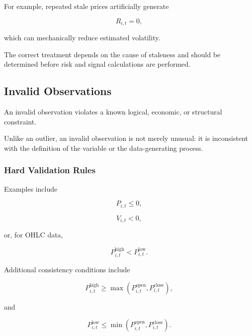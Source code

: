 \documentclass[11pt,a4paper]{article}
\begin{document}
For example, repeated stale prices artificially generate

\begin{equation}
R_{i,t}=0,
\end{equation}

which can mechanically reduce estimated volatility.

The correct treatment depends on the cause of staleness and should be
determined before risk and signal calculations are performed.


\subsection{Invalid Observations}
\label{subsec:invalid_observations}

An invalid observation violates a known logical, economic, or structural
constraint.

Unlike an outlier, an invalid observation is not merely unusual: it is
inconsistent with the definition of the variable or the data-generating
process.


\subsubsection{Hard Validation Rules}

Examples include

\begin{equation}
P_{i,t}\leq0,
\end{equation}

\begin{equation}
V_{i,t}<0,
\end{equation}

or, for OHLC data,

\begin{equation}
P_{i,t}^{\mathrm{high}}
<
P_{i,t}^{\mathrm{low}}.
\end{equation}

Additional consistency conditions include

\begin{equation}
P_{i,t}^{\mathrm{high}}
\geq
\max
\left(
P_{i,t}^{\mathrm{open}},
P_{i,t}^{\mathrm{close}}
\right),
\end{equation}

and

\begin{equation}
P_{i,t}^{\mathrm{low}}
\leq
\min
\left(
P_{i,t}^{\mathrm{open}},
P_{i,t}^{\mathrm{close}}
\right).
\end{equation}
\end{document}
